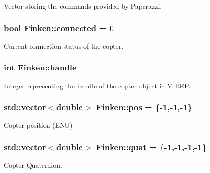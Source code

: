 Vector storing the commands provided by Paparazzi. 

\subsubsection[{\texorpdfstring{connected}{connected}}]{\setlength{\rightskip}{0pt plus 5cm}bool Finken\+::connected = 0}\hypertarget{classFinken_a83131e08852cbcebaffa1eef80164a6e}{}\label{classFinken_a83131e08852cbcebaffa1eef80164a6e}


Current connection status of the copter. 

\subsubsection[{\texorpdfstring{handle}{handle}}]{\setlength{\rightskip}{0pt plus 5cm}int Finken\+::handle}\hypertarget{classFinken_a96990553bc26c8bf26effe8edd6e6369}{}\label{classFinken_a96990553bc26c8bf26effe8edd6e6369}


Integer representing the handle of the copter object in V-\/\+R\+EP. 

\subsubsection[{\texorpdfstring{pos}{pos}}]{\setlength{\rightskip}{0pt plus 5cm}std\+::vector$<$double$>$ Finken\+::pos = \{-\/1,-\/1,-\/1\}}\hypertarget{classFinken_a726c0ea1d756fe0837a3f042665d8d4a}{}\label{classFinken_a726c0ea1d756fe0837a3f042665d8d4a}


Copter position (E\+NU) 

\subsubsection[{\texorpdfstring{quat}{quat}}]{\setlength{\rightskip}{0pt plus 5cm}std\+::vector$<$double$>$ Finken\+::quat = \{-\/1,-\/1,-\/1,-\/1\}}\hypertarget{classFinken_a3968cbe3b6f76678367ecb61f044a221}{}\label{classFinken_a3968cbe3b6f76678367ecb61f044a221}


Copter Quaternion. 

